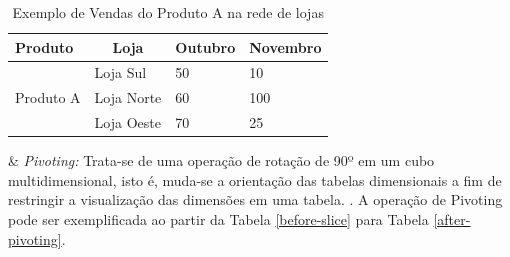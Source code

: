 \begin{table}[ht]
\centering
\begin{tabular}{|c|l|l|l|}
\hline
\multicolumn{1}{|l|}{Produto} & \multicolumn{1}{|c|}{Loja} & Outubro & Novembro \\ \hline
\multirow{3}{*}{Produto A}    & Loja Sul                   & 50      & 10       \\ \cline{2-4} 
\multicolumn{1}{|l|}{}        & Loja Norte                 & 60      & 100      \\ \cline{2-4} 
\multicolumn{1}{|l|}{}        & Loja Oeste                 & 70      & 25       \\ \hline
\end{tabular}
\caption{Exemplo de Vendas do Produto A na rede de lojas}
\label{after-slice}
\end{table}


\begin{easylist}[itemize]

& \textit{Pivoting:} Trata-se de uma operação de rotação de 90º em um cubo multidimensional, isto é, muda-se a orientação das tabelas dimensionais a fim de restringir a visualização das dimensões em uma tabela. \cite{andre2000}. A operação de Pivoting pode ser exemplificada ao partir da Tabela \ref{before-slice} para Tabela \ref{after-pivoting}.


\end{easylist}



